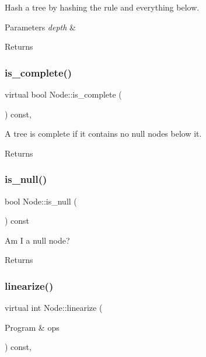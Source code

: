 Hash a tree by hashing the rule and everything below. 
\begin{DoxyParams}{Parameters}
{\em depth} & \\
\hline
\end{DoxyParams}
\begin{DoxyReturn}{Returns}

\end{DoxyReturn}
\mbox{\label{class_node_ac2e36754ba8b1b1d452deeb2bdbd346f}} 
\subsubsection{\texorpdfstring{is\+\_\+complete()}{is\_complete()}}
{\footnotesize\ttfamily virtual bool Node\+::is\+\_\+complete (\begin{DoxyParamCaption}{ }\end{DoxyParamCaption}) const\hspace{0.3cm}{\ttfamily [inline]}, {\ttfamily [virtual]}}

A tree is complete if it contains no null nodes below it. \begin{DoxyReturn}{Returns}

\end{DoxyReturn}
\mbox{\label{class_node_a895ef3b66f975fbaec1e5866a57afbed}} 
\subsubsection{\texorpdfstring{is\+\_\+null()}{is\_null()}}
{\footnotesize\ttfamily bool Node\+::is\+\_\+null (\begin{DoxyParamCaption}{ }\end{DoxyParamCaption}) const\hspace{0.3cm}{\ttfamily [inline]}}

Am I a null node? \begin{DoxyReturn}{Returns}

\end{DoxyReturn}
\mbox{\label{class_node_a54676f34db2c299693c9b55148589230}} 
\subsubsection{\texorpdfstring{linearize()}{linearize()}}
{\footnotesize\ttfamily virtual int Node\+::linearize (\begin{DoxyParamCaption}\item[{Program \&}]{ops }\end{DoxyParamCaption}) const\hspace{0.3cm}{\ttfamily [inline]}, {\ttfamily [virtual]}}

